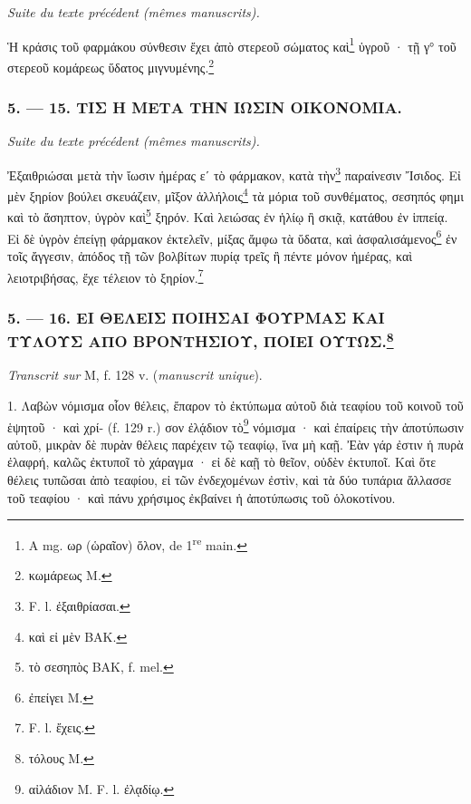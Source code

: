 \documentclass[a4paper, 11pt, oneside, polutonikogreek, french]{article}
\begin{document}
\emph{Suite du texte précédent (mêmes manuscrits).}

\bigskip

Ἡ κράσις τοῦ φαρμάκου σύνθεσιν ἔχει ἀπὸ στερεοῦ σώματος καὶ\footnote{A mg. ωρ (ὡραῖον) ὅλον, de 1\textsuperscript{re} main.} ὑγροῦ · τῇ γ° τοῦ στερεοῦ κομάρεως ὕδατος μιγνυμένης.\footnote{κωμάρεως M.}

\bigskip
\centerline{\EightStarTaper}
\centerline{\EightStarTaper\EightStarTaper}
\bigskip

\subsubsection{5. --- 15. ΤΙΣ Η ΜΕΤΑ ΤΗΝ ΙΩΣΙΝ ΟΙΚΟΝΟΜΙΑ.}

\emph{Suite du texte précédent (mêmes manuscrits).}

\bigskip

Ἐξαιθριώσαι μετὰ τὴν ἴωσιν ἡμέρας εʹ τὸ φάρμακον, κατὰ τὴν\footnote{F. l. ἐξαιθρίασαι.} παραίνεσιν Ἴσιδος. Εἰ μὲν ξηρίον βούλει σκευάζειν, μῖξον ἀλλήλοις\footnote{καὶ εἰ μὲν BAK.} τὰ μόρια τοῦ συνθέματος, σεσηπός φημι καὶ τὸ ἄσηπτον, ὑγρὸν καὶ\footnote{τὸ σεσηπὸς BAK, f. mel.} ξηρόν. Καὶ λειώσας ἐν ἡλίῳ ἢ σκιᾷ, κατάθου ἐν ἱππείᾳ. Εἰ δὲ ὑγρὸν ἐπείγῃ φάρμακον ἐκτελεῖν, μίξας ἄμφω τὰ ὕδατα, καὶ ἀσφαλισάμενος\footnote{ἐπείγει M.} ἐν τοῖς ἄγγεσιν, ἀπόδος τῇ τῶν βολβίτων πυρίᾳ τρεῖς ἢ πέντε μόνον ἡμέρας, καὶ λειοτριβήσας, ἔχε τέλειον τὸ ξηρίον.\footnote{F. l. ἔχεις.}

\bigskip
\centerline{\EightStarTaper}
\centerline{\EightStarTaper\EightStarTaper}
\bigskip

\subsubsection[5. --- 16. ΕΙ ΘΕΛΕΙΣ ΠΟΙΗΣΑΙ ΦΟΥΡΜΑΣ ΚΑΙ ΤΥΛΟΥΣ ΑΠΟ ΒΡΟΝΤΗΣΙΟΥ, ΠΟΙΕΙ ΟΥΤΩΣ.]{5. --- 16. ΕΙ ΘΕΛΕΙΣ ΠΟΙΗΣΑΙ ΦΟΥΡΜΑΣ ΚΑΙ ΤΥΛΟΥΣ ΑΠΟ ΒΡΟΝΤΗΣΙΟΥ, ΠΟΙΕΙ ΟΥΤΩΣ.\footnote{τόλους M.}}

\emph{Transcrit sur} M, f. 128 v. (\emph{manuscrit unique}).

\bigskip

1. Λαβὼν νόμισμα οἷον θέλεις, ἔπαρον τὸ ἐκτύπωμα αὐτοῦ διὰ τεαφίου τοῦ κοινοῦ τοῦ ἑψητοῦ · καὶ χρί- (f. 129 r.) σον ἐλᾴδιον τὸ\footnote{αἰλάδιον M. F. l. ἐλᾳδίῳ.} νόμισμα · καὶ ἐπαίρεις τὴν ἀποτύπωσιν αὐτοῦ, μικρὰν δὲ πυρὰν θέλεις παρέχειν τῷ τεαφίῳ, ἵνα μὴ καῇ. Ἐὰν γάρ ἐστιν ἡ πυρὰ ἐλαφρή, καλῶς ἐκτυποῖ τὸ χάραγμα · εἰ δὲ καῇ τὸ θεῖον, οὐδὲν ἐκτυποῖ. Καὶ ὅτε θέλεις τυπῶσαι ἀπὸ τεαφίου, εἰ τῶν ἐνδεχομένων ἐστὶν, καὶ τὰ δύο τυπάρια ἄλλασσε τοῦ τεαφίου · καὶ πάνυ χρήσιμος ἐκβαίνει ἡ ἀποτύπωσις τοῦ ὁλοκοτίνου.
\end{document}
